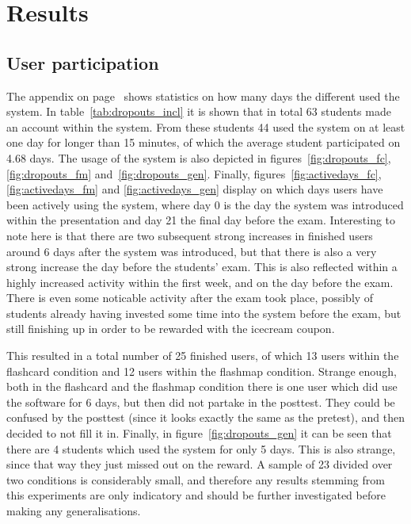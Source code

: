 \chapter{Results}
\label{ch:results}

\section{User participation}

The  appendix on page~\pageref{app:dropouts} shows statistics on how many days the different used the system. In table~\ref{tab:dropouts_incl} it is shown that in total 63 students made an account within the system. From these students 44 used the system on at least one day for longer than 15 minutes, of which the average student participated on 4.68 days. The usage of the system is also depicted in figures~\ref{fig:dropouts_fc}, \ref{fig:dropouts_fm} and~\ref{fig:dropouts_gen}. Finally, figures~\ref{fig:activedays_fc}, \ref{fig:activedays_fm} and \ref{fig:activedays_gen} display on which days users have been actively using the system, where day 0 is the day the system was introduced within the presentation and day 21 the final day before the exam. Interesting to note here is that there are two subsequent strong increases in finished users around 6 days after the system was introduced, but that there is also a very strong increase the day before the students' exam. This is also reflected within a highly increased activity within the first week, and on the day before the exam. There is even some noticable activity after the exam took place, possibly of students already having invested some time into the system before the exam, but still finishing up in order to be rewarded with the icecream coupon.

This resulted in a total number of 25 finished users, of which 13 users within the flashcard condition and 12 users within the flashmap condition. Strange enough, both in the flashcard and the flashmap condition there is one user which did use the software for 6 days, but then did not partake in the posttest. They could be confused by the posttest (since it looks exactly the same as the pretest), and then decided to not fill it in. Finally, in figure~\ref{fig:dropouts_gen} it can be seen that there are 4 students which used the system for only 5 days. This is also strange, since that way they just missed out on the reward. A sample of 23 divided over two conditions is considerably small, and therefore any results stemming from this experiments are only indicatory and should be further investigated before making any generalisations.

